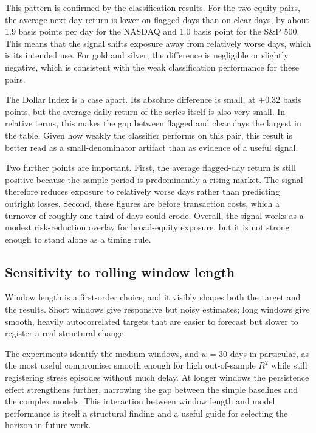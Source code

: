 This pattern is confirmed by the classification results. For the two equity pairs, the average next-day return is lower on flagged days than on clear days, by about 1.9 basis points per day for the NASDAQ and 1.0 basis point for the S\&P 500. This means that the signal shifts exposure away from relatively worse days, which is its intended use. For gold and silver, the difference is negligible or slightly negative, which is consistent with the weak classification performance for these pairs.

The Dollar Index is a case apart. Its absolute difference is small, at $+0.32$ basis points, but the average daily return of the series itself is also very small. In relative terms, this makes the gap between flagged and clear days the largest in the table. Given how weakly the classifier performs on this pair, this result is better read as a small-denominator artifact than as evidence of a useful signal.

Two further points are important. First, the average flagged-day return is still positive because the sample period is predominantly a rising market. The signal therefore reduces exposure to relatively worse days rather than predicting outright losses. Second, these figures are before transaction costs, which a turnover of roughly one third of days could erode. Overall, the signal works as a modest risk-reduction overlay for broad-equity exposure, but it is not strong enough to stand alone as a timing rule.

\subsection{Sensitivity to rolling window length}
\label{sec:window_sensitivity}

Window length is a first-order choice, and it visibly shapes both the target and the results. Short windows give responsive but noisy estimates; long windows give smooth, heavily autocorrelated targets that are easier to forecast but slower to register a real structural change.

The experiments identify the medium windows, and $w = 30$ days in particular, as the most useful compromise: smooth enough for high out-of-sample $R^2$ while still registering stress episodes without much delay. At longer windows the persistence effect strengthens further, narrowing the gap between the simple baselines and the complex models. This interaction between window length and model performance is itself a structural finding and a useful guide for selecting the horizon in future work.

